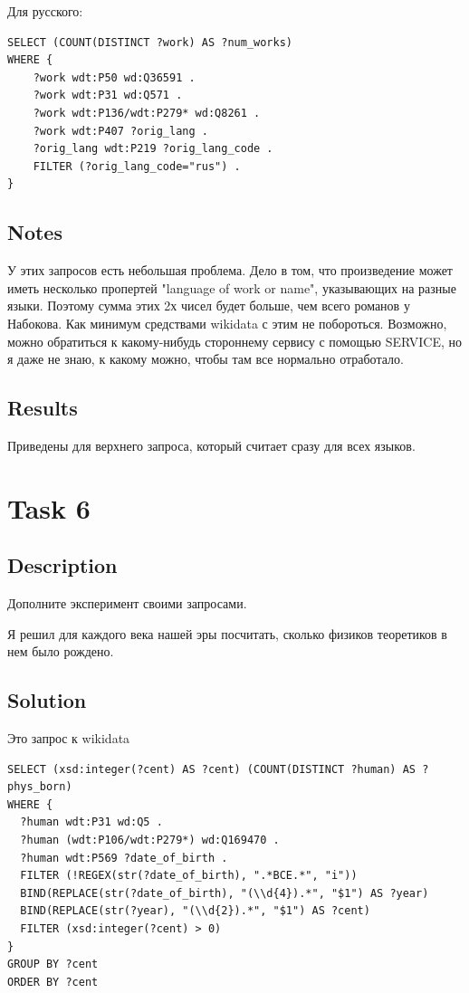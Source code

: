 \documentclass{article}
\begin{document}
Для русского: 

\begin{verbatim}
SELECT (COUNT(DISTINCT ?work) AS ?num_works)
WHERE {
    ?work wdt:P50 wd:Q36591 .
    ?work wdt:P31 wd:Q571 .
    ?work wdt:P136/wdt:P279* wd:Q8261 .
    ?work wdt:P407 ?orig_lang .
    ?orig_lang wdt:P219 ?orig_lang_code .
    FILTER (?orig_lang_code="rus") .
}
\end{verbatim}
\subsection*{Notes}
У этих запросов есть небольшая проблема. Дело в том, что произведение может иметь несколько пропертей "language of work or name", указывающих на разные языки. Поэтому сумма этих 2х чисел будет больше, чем всего романов у Набокова.
Как минимум средствами wikidata с этим не побороться. Возможно, можно обратиться к какому-нибудь стороннему сервису
с помощью SERVICE, но я даже не знаю, к какому можно, чтобы там все нормально отработало.

\subsection*{Results}

Приведены для верхнего запроса, который считает сразу для всех языков.

\noindent{}

\section*{Task 6}

\subsection*{Description}

Дополните эксперимент своими запросами.

Я решил для каждого века нашей эры посчитать, сколько физиков теоретиков в нем было рождено.
\subsection*{Solution}
Это запрос к wikidata

\begin{verbatim}
SELECT (xsd:integer(?cent) AS ?cent) (COUNT(DISTINCT ?human) AS ?phys_born)
WHERE {
  ?human wdt:P31 wd:Q5 .
  ?human (wdt:P106/wdt:P279*) wd:Q169470 .
  ?human wdt:P569 ?date_of_birth .
  FILTER (!REGEX(str(?date_of_birth), ".*BCE.*", "i"))
  BIND(REPLACE(str(?date_of_birth), "(\\d{4}).*", "$1") AS ?year)
  BIND(REPLACE(str(?year), "(\\d{2}).*", "$1") AS ?cent)
  FILTER (xsd:integer(?cent) > 0)  
}
GROUP BY ?cent
ORDER BY ?cent
\end{verbatim}
\end{document}
